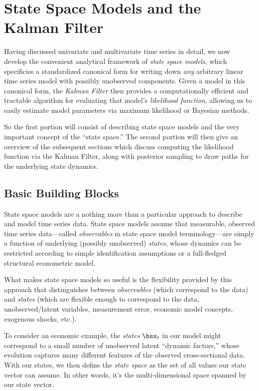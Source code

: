 \documentclass[12pt]{article}
\theoremstyle{plain}
\theoremstyle{definition}
\theoremstyle{remark}
\begin{document}
\clearpage
\section{State Space Models and the Kalman Filter}

Having discussed univariate and multivariate time series in detail, we
now develop the convenient analytical framework of
\emph{state space models}, which specificies a standardized canonical
form for writing down \emph{any} arbitrary linear time series model with
possibly unobserved components.
Given a model in this canonical form, the \emph{Kalman Filter} then
provides a computationally efficient and tractable
algorithm for evaluating that model's \emph{likelihood function},
allowing us to easily estimate model parameters via maximum likelihood
or Bayesian methods.

So the first portion will consist of describing state space models and
the very important concept of the ``state space.'' The second portion
will then give an overview of the subsequent sections which discuss
computing the likelihood function via the Kalman Filter, along with
posterior sampling to draw paths for the underlying state dynamics.


\subsection{Basic Building Blocks}

State space models are a nothing more than a particular approach to
describe and model time series data. State space models assume
that measurable, observed time series data---called \emph{observables} in
state space model terminology---are simply a function of underlying
(possibly unobserved) \emph{states}, whose dynamics can be restricted
according to simple identification assumptions or a full-fledged
structural econometric model.

What makes state space models so useful is the flexibility provided by
this approach that distinguishes between \emph{observables} (which
correspond to the data) and \emph{states} (which are flexible enough to
correspond to the data, unobserved/latent variables, measurement error,
economic model concepts, exogenous shocks, etc.).

To consider an economic example, the \emph{states} $\bss_t$ in our model
might correspond to a small number of unobserved latent ``dynamic
factors,'' whose evolution captures many different features of the
observed cross-sectional data.  With our states, we then define the
\emph{state space} as the set of all values our state vector can assume.
In other words, it's the multi-dimensional space spanned by our state
vector.
\end{document}
